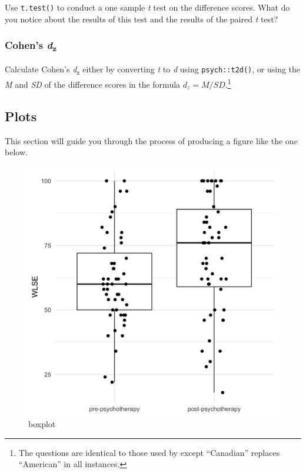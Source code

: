 \documentclass[
]{book}
\begin{document}
Use \texttt{t.test()} to conduct a one sample \emph{t} test on the difference scores. What do you notice about the results of this test and the results of the paired \emph{t} test?

\hypertarget{cohens-dz}{%
\subsubsection{\texorpdfstring{Cohen's \emph{d}\textsubscript{z}}{Cohen's dz}}\label{cohens-dz}}

Calculate Cohen's \emph{d}\textsubscript{z} either by converting \emph{t} to \emph{d} using \texttt{psych::t2d()}, or using the \emph{M} and \emph{SD} of the difference scores in the formula \(d_{z} = M/SD\).\footnote{The questions are identical to those used by \citet{davies2008} except ``Canadian'' replaces ``American'' in all instances.}

\hypertarget{pst-plotting}{%
\subsection{Plots}\label{pst-plotting}}

This section will guide you through the process of producing a figure like the one below.

\begin{figure}
\centering
\includegraphics{img/wlse-boxplot.png}
\caption{boxplot}
\end{figure}
\end{document}
